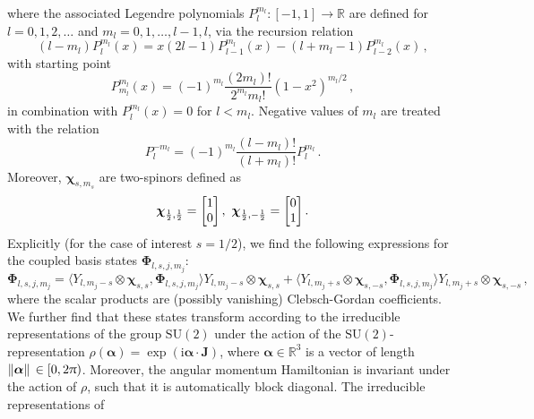 \documentclass[fontsize=12pt,
               twoside=false,
               BCOR=0mm,
               DIV=14,
               overfullrule=true, %
               toc=bibliography,
               headinclude=true,
               footinclude=false]{scrartcl}
\numberwithin{equation}{section}
\newcommand{\ii}{\mathrm{i}}
\newcommand{\pii}{\uppi}
\begin{document}
    where the associated Legendre polynomials
    $P^{m_l}_l\colon[-1,1]\to\mathbb{R}$ are defined for $l=0,1,2,\dots$ and
    $m_l=0,1,\dots,l-1,l$, via the recursion relation
    \begin{equation}
        (l-m_l) P^{m_l}_l(x)
        =
        x (2l-1) P^{m_l}_{l-1}(x)
        -
        (l+m_l-1) P^{m_l}_{l-2}(x)
    \,,
    \end{equation}
    with starting point
    \begin{equation}
        P^{m_l}_{m_l}(x)
        =
        (-1)^{m_l}\frac{(2m_l)!}{2^{m_l}m_l!} (1-x^2)^{m_l\slash{2}}
    \,,
    \end{equation}
    in combination with $P^{m_l}_l(x)=0$ for $l<m_l$. Negative values of $m_l$
    are treated with the relation
    \begin{equation}
        P^{-m_l}_l = (-1)^{m_l} \frac{(l-m_l)!}{(l+m_l)!}P^{m_l}_l
    \,.
    \end{equation}
    Moreover, $\bm{\chi}_{s,m_s}$ are two-spinors defined as
    \begin{equation}\label{eq:twoSpinsors}
        \bm{\chi}_{\frac{1}{2},\frac{1}{2}}=\mqty[1 \\ 0]
    \,, \
        \bm{\chi}_{\frac{1}{2},-\frac{1}{2}}=\mqty[0 \\ 1]
    \,.
    \end{equation}
    Explicitly (for the case of interest $s=1\slash{2}$), we find the following
    expressions for the coupled basis states $\bm{\Phi}_{l,s,j,m_j}$:
    \begin{equation}\label{eq:coupledBasis}
        \bm{\Phi}_{l,s,j,m_j}
        =
        \langle Y_{l,m_j-s}\otimes\bm{\chi}_{s,s},\bm{\Phi}_{l,s,j,m_j} \rangle
        Y_{l,m_j-s}\otimes\bm{\chi}_{s,s}
        +
        \langle Y_{l,m_j+s}\otimes\bm{\chi}_{s,-s},\bm{\Phi}_{l,s,j,m_j} \rangle
        Y_{l,m_j+s}\otimes\bm{\chi}_{s,-s}
    \,,
    \end{equation}
    where the scalar products are (possibly vanishing) Clebsch-Gordan
    coefficients. We further find that these states transform according to the
    irreducible representations of the group $\mathrm{SU}(2)$ under the action
    of the $\mathrm{SU}(2)$-representation
    $\rho(\bm{\alpha})=\exp(\ii\bm{\alpha}\cdot\bm{J})$, where
    $\bm{\alpha}\in\mathbb{R}^3$ is a vector of length
    $\norm*{\bm{\alpha}}\in[0,2\pii)$. Moreover, the angular momentum
    Hamiltonian is invariant under the action of $\rho$, such that it is
    automatically block diagonal. The irreducible representations of
\end{document}
